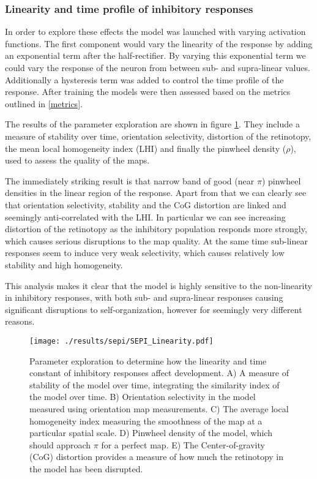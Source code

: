 \subsubsection{Linearity and time profile of inhibitory responses}

In order to explore these effects the model was launched with varying
activation functions. The first component would vary the linearity of
the response by adding an exponential term after the
half-rectifier. By varying this exponential term we could vary the
response of the neuron from between sub- and supra-linear
values. Additionally a hysteresis term was added to control the time
profile of the response. After training the models were then assessed
based on the metrics outlined in \ref{metrics}.

The results of the parameter exploration are shown in figure
\ref{SEPILinearity}. They include a measure of stability over time,
orientation selectivity, distortion of the retinotopy, the mean local
homogeneity index (LHI) and finally the pinwheel density ($\rho$),
used to assess the quality of the maps.

The immediately striking result is that narrow band of good (near
$\pi$) pinwheel densities in the linear region of the response. Apart
from that we can clearly see that orientation selectivity, stability
and the CoG distortion are linked and seemingly anti-correlated with
the LHI. In particular we can see increasing distortion of the
retinotopy as the inhibitory population responds more strongly, which
causes serious disruptions to the map quality. At the same time
sub-linear responses seem to induce very weak selectivity, which
causes relatively low stability and high homogeneity.

This analysis makes it clear that the model is highly sensitive to the
non-linearity in inhibitory responses, with both sub- and supra-linear
responses causing significant disruptions to self-organization,
however for seemingly very different reasons.

\begin{figure}
	\centering
        \texttt{[image: ./results/sepi/SEPI\_Linearity.pdf]}
	\caption{Parameter exploration to determine how the linearity and
      time constant of inhibitory responses affect development. A) A
      measure of stability of the model over time, integrating the
      similarity index of the model over time. B) Orientation
      selectivity in the model measured using orientation map
      measurements. C) The average local homogeneity index measuring
      the smoothness of the map at a particular spatial scale. D)
      Pinwheel density of the model, which should approach $\pi$ for a
      perfect map. E) The Center-of-gravity (CoG) distortion provides
      a measure of how much the retinotopy in the model has been
      disrupted.}
	\label{SEPILinearity}
\end{figure}

